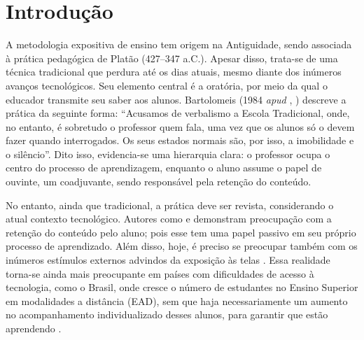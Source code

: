 \chapter{Introdução}
\label{chp:introducao}

A metodologia expositiva de ensino tem origem na Antiguidade, sendo associada à prática pedagógica de Platão (427–347 a.C.)\cite{andreataAulaExpositivaPaulo2019}. Apesar disso, trata-se de uma técnica tradicional que perdura até os dias atuais, mesmo diante dos inúmeros avanços tecnológicos. Seu elemento central é a oratória, por meio da qual o educador transmite seu saber aos alunos. Bartolomeis (1984 \textit{apud} \citeauthor{andreataAulaExpositivaPaulo2019}, \citeyear{andreataAulaExpositivaPaulo2019}) descreve a prática da seguinte forma: ``Acusamos de verbalismo a Escola Tradicional, onde, no entanto, é  sobretudo o professor quem fala, uma vez que os alunos só o devem  fazer quando interrogados. Os seus estados normais são, por isso, a imobilidade e o silêncio''. Dito isso, evidencia-se uma hierarquia clara: o professor ocupa o centro do processo de aprendizagem, enquanto o aluno assume o papel de ouvinte, um coadjuvante, sendo responsável pela retenção do conteúdo.

No entanto, ainda que tradicional, a prática deve ser revista, considerando o atual contexto tecnológico. Autores como  e  demonstram preocupação com a retenção do conteúdo pelo aluno; pois esse tem uma papel passivo em seu próprio processo de aprendizado. Além disso, hoje, é preciso se preocupar também com os inúmeros estímulos externos advindos da exposição às telas \cite{lopesUsoCelularEm2017}. Essa realidade torna-se ainda mais preocupante em países com dificuldades de acesso à tecnologia, como o Brasil, onde cresce o número de estudantes no Ensino Superior em modalidades a distância (EAD), sem que haja necessariamente um aumento no acompanhamento individualizado desses alunos, para garantir que estão aprendendo \cite{moranEnsinoSuperiorDistancia2009}.








% 
